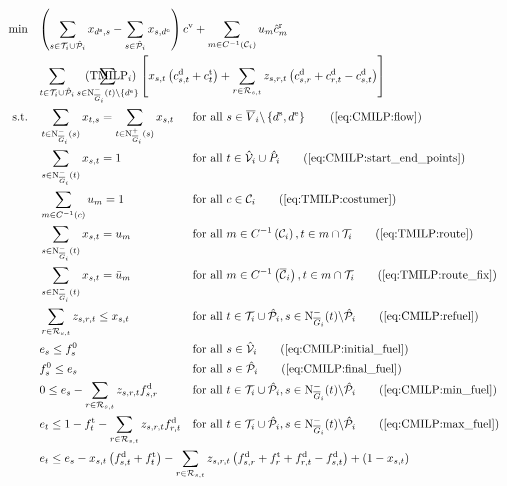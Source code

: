 \begin{align}
	\min \quad & \omit\rlap{$\displaystyle{\left(\sum_{s\in\Ti\cup\Phat_i} x_{\ds,s} - \sum_{s\in\Phat_i} x_{s,\de}\right) \cv + \sum_{m\in C^{-1}\left(\mathcal{C}_i\right)} u_m \hat{c}^{\operatorname{r}}_m}$} \nonumber \\
	& \omit\rlap{$\displaystyle{\sum_{t\in\Ti\cup\Phat_i}\sum_{s\in\Ninoi(t)\backslash\left\{\de\right\}}\left[x_{s,t}\left(\cd_{s,t}+\ct_t\right)+\sum_{r\in\Rst}z_{s,r,t}\left(\cd_{s,r}+\cd_{r,t}-\cd_{s,t}\right)\right]}$} \tag{$\operatorname{TMILP}_i$} \label{eq:TMILPi} \\
	\text{s.t.} \quad & \sum_{t\in\Ninoi(s)} x_{t,s} = \sum_{t\in\Noutoi(s)} x_{s,t} & & \text{for all } s\in \overline{V}_i\backslash\left\{\ds,\de\right\} \tag{\ref{eq:CMILP:flow}} \\
	&\sum_{s\in\Ninoi(t)} x_{s,t} = 1 && \text{for all } t\in\hat{\mathcal{V}}_i\cup\hat{P}_i \tag{\ref{eq:CMILP:start_end_points}} \\
	&\sum_{m\in C^{-1}(c)} u_m = 1 && \text{for all } c\in\mathcal{C}_i \tag{\ref{eq:TMILP:costumer}} \\
	&\sum_{s\in\Ninoi(t)} x_{s,t} = u_m && \text{for all } m\in C^{-1}\left(\mathcal{C}_i\right), t\in m\cap\Ti \tag{\ref{eq:TMILP:route}} \\
	&\sum_{s\in\Ninoi(t)} x_{s,t} = \bar{u}_m && \text{for all } m\in C^{-1}\left(\overline{\mathcal{C}}_i\right), t\in m\cap\Ti \tag{\ref{eq:TMILP:route_fix}} \\
	& \sum_{r\in\Rst} z_{s,r,t} \leq x_{s,t} & & \text{for all } t\in\Ti\cup\Phat_i, s\in\Ninoi(t)\backslash\Phat_i \tag{\ref{eq:CMILP:refuel}} \\
	& e_s \leq f_s^0 & & \text{for all } s\in\Vhat_i \tag{\ref{eq:CMILP:initial_fuel}} \\
	& f^0_s \leq e_s && \text{for all } s\in\Phat_i \tag{\ref{eq:CMILP:final_fuel}} \\
	& 0 \leq e_s - \sum_{r\in\Rst} z_{s,r,t}\fd_{s,r} & & \text{for all } t\in\Ti\cup\Phat_i, s\in\Ninoi(t)\backslash\Phat_i \tag{\ref{eq:CMILP:min_fuel}} \\
	& e_t \leq 1 - \ft_t - \sum_{r\in\Rst} z_{s,r,t}\fd_{r,t} & & \text{for all } t\in\Ti\cup\Phat_i, s\in\Ninoi(t)\backslash\Phat_i \tag{\ref{eq:CMILP:max_fuel}} \\
	& \omit\rlap{$\displaystyle{e_t \leq e_s - x_{s,t}\left(f_{s,t}^{\operatorname{d}}+f_t^{\operatorname{t}}\right) - \sum_{r\in\Rst} z_{s,r,t}\left(\fd_{s,r}+\ft_r+\fd_{r,t}-\fd_{s,t}\right) + \left(1-x_{s,t}\right)}$} \nonumber \\

\end{align}

